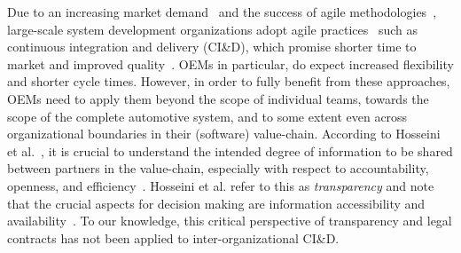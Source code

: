 Due to an increasing market demand~\cite{olsson2012climbing} and the success of agile methodologies~\cite{laanti2011agile}, large-scale system development organizations adopt agile practices~\cite{jalali2010agile} such as continuous integration and delivery (CI\&D), which promise shorter time to market and improved quality~\cite{olsson2012climbing}.
OEMs in particular, do expect increased flexibility and shorter cycle times.
However, in order to fully benefit from these approaches, OEMs need to apply them %
beyond the scope of individual teams, towards the scope of the complete automotive system,  %
and to some extent even across organizational boundaries in their (software) value-chain. %
According to Hosseini et al.~\cite{Hosseini2016}, it is crucial to understand the intended degree of information to be shared between partners in the value-chain, especially with respect to accountability, openness, and efficiency~\cite{Ball2009}.
Hosseini et al. refer to this as \emph{transparency} and note that the crucial aspects for decision making are information accessibility and availability~\cite{Hosseini2016,Turilli2009}.
To our knowledge, this {critical perspective of transparency and legal contracts} has not been applied to inter-organizational CI\&D. %

